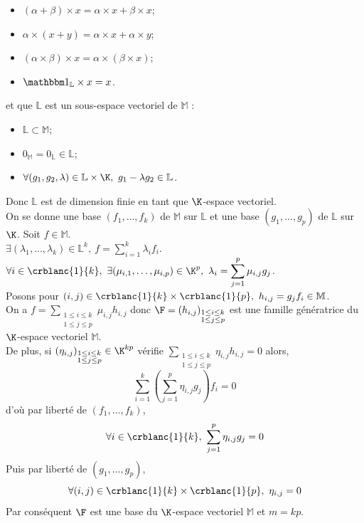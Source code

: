\documentclass[8pt]{book}
\begin{document}
\begin{enumerate}[leftmargin=*]
\begin{itemize}
			\item $(\alpha+\beta)\times x=\alpha\times x+\beta\times x$;
			\item $\alpha\times(x+y)=\alpha\times x+\alpha\times y$;
			\item $(\alpha\times\beta)\times x=\alpha\times(\beta\times x)$;
			\item $\mathbbm 1_{\mathbb L}\times x=x$.
		\end{itemize}
		et que $\mathbb L$ est un sous-espace vectoriel de $\mathbb M$ :
		\begin{itemize}
			\item $\mathbb L\subset \mathbb M$;
			\item $0_{\mathbb M}=0_{\mathbb L}\in \mathbb L$;
			\item $\forall (g_1,g_2,\lambda)\in \mathbb L\times \K,\ g_1-\lambda g_2\in \mathbb L$.
		\end{itemize}
		Donc $\mathbb L$ est de dimension finie en tant que $\K$-espace vectoriel.\\
		On se donne une base $(f_1,\dots,f_k)$ de $\mathbb M$ sur $\mathbb L$ et une base $(g_1,\dots,g_p)$ de $\mathbb L$ sur $\K$. Soit $f\in \mathbb M$.\\
		$\exists (\lambda_1,\dots,\lambda_k)\in \mathbb L^k,\ f=\displaystyle\sum_{i=1}^k\lambda_if_i$.\\
		$\forall i\in \crblanc{1}{k},\ \exists (\mu_{i,1},\dots,\mu_{i,p})\in \K^p,\ \lambda_i=\displaystyle\sum_{j=1}^p\mu_{i,j}g_j$.\\
		Posons pour $(i,j)\in \crblanc{1}{k}\times\crblanc{1}{p},\ h_{i,j}=g_jf_i\in \mathbb M$.\\
		On a $f=\displaystyle\sum_{\substack{1\leq i\leq k\\1\leq j\leq p}}\mu_{i,j}h_{i,j}$ donc $\F=(h_{i,j})_{\substack{1\leq i\leq k\\1\leq j\leq p}}$ est une famille génératrice du $\K$-espace vectoriel $\mathbb M$.\\
		De plus, si $(\eta_{i,j})_{\substack{1\leq i\leq k\\1\leq j\leq p}}\in \K^{kp}$ vérifie $\displaystyle\sum_{\substack{1\leq i\leq k\\1\leq j\leq p}}\eta_{i,j}h_{i,j}=0$ alors,
		$$\displaystyle\sum_{i=1}^k\left(\sum_{j=1}^p\eta_{i,j}g_j\right)f_i=0$$
		d'où par liberté de $(f_1,\dots,f_k)$,
		$$\forall i\in \crblanc{1}{k},\ \displaystyle\sum_{j=1}^p\eta_{i,j}g_j=0$$
		Puis par liberté de $(g_1,\dots,g_p)$,
		$$\forall (i,j)\in \crblanc{1}{k}\times\crblanc{1}{p},\ \eta_{i,j}=0$$
		Par conséquent $\F$ est une base du $\K$-espace vectoriel $\mathbb M$ et $m=kp$.\\\\

\end{enumerate}
\end{document}
